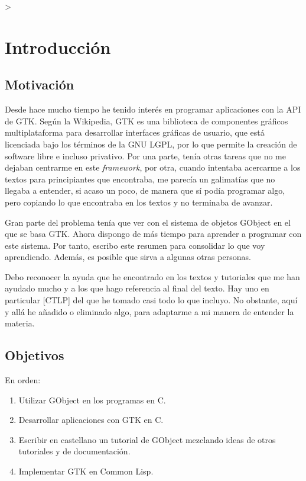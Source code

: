  >%
%

\section{Introducción}

\subsection{Motivación} \label{subsec:motivacion}
Desde hace mucho tiempo he tenido interés en programar aplicaciones con la API de GTK.
Según la Wikipedia, GTK es una biblioteca de componentes gráficos multiplataforma para desarrollar
interfaces gráficas de usuario, que está licenciada bajo los términos de la GNU LGPL, por lo que
permite la creación de software libre e incluso privativo.
Por una parte, tenía otras tareas que no me dejaban centrarme en este \textit{framework},
por otra, cuando intentaba acercarme a los textos para principiantes que encontraba, me parecía un
galimatías que no llegaba a entender, si acaso un poco, de manera que sí podía programar algo, pero
copiando lo que encontraba en los textos y no terminaba de avanzar.

Gran parte del problema tenía que ver con el sistema de objetos \textsf{GObject} en el que se basa GTK.
Ahora dispongo de más tiempo para aprender a programar con este sistema. Por tanto, escribo este
resumen para consolidar  lo que voy aprendiendo. Además, es posible que sirva a algunas otras personas.

Debo reconocer la ayuda que he encontrado en los textos y tutoriales que me han ayudado mucho y
a los que hago referencia al final del texto. Hay uno en particular [CTLP] del que he tomado casi todo lo
que incluyo. No obstante, aquí y allá he añadido o eliminado algo, para adaptarme a mi manera de entender
la materia.
\subsection{Objetivos} \label{subsec:objetivos}
En orden:
\begin{enumerate}
  \tightlist
\item Utilizar \textsf{GObject} en los programas en C.
\item Desarrollar aplicaciones con GTK en C.
\item Escribir en castellano un tutorial de GObject mezclando ideas de otros tutoriales y de documentación.
\item Implementar GTK en Common Lisp.
\end{enumerate}

